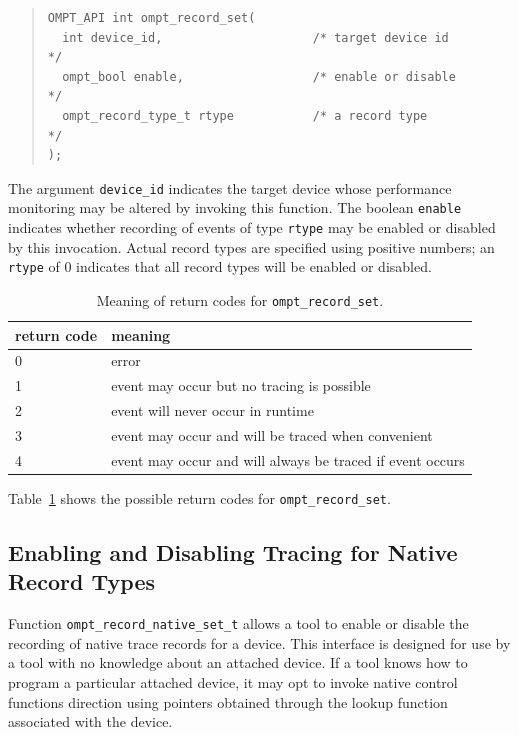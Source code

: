 \documentclass{article}
\begin{document}
\begin{quote}
\begin{verbatim}
OMPT_API int ompt_record_set(
  int device_id,                     /* target device id          */
  ompt_bool enable,                  /* enable or disable         */
  ompt_record_type_t rtype           /* a record type             */
);
\end{verbatim}
\end{quote}
The argument \verb|device_id| indicates the target device whose performance monitoring may be altered by invoking this function. The boolean \verb|enable| indicates whether recording of events of type \verb|rtype| may be enabled or disabled by this invocation.
Actual record types are specified using positive numbers; an \verb|rtype| of  0 indicates that all record types will be enabled or disabled.

\begin{table}
\centering
\begin{tabular}{|l|l|}
\hline
return code & meaning \\\hline
0 & error\\\hline
1 & event may occur but no tracing is possible\\\hline
2 & event will never occur in runtime\\\hline
3 & event may occur and will be traced  when convenient\\\hline
4 & event may occur and will always be traced if event occurs\\\hline
\end{tabular}
\caption{Meaning of return codes for {\tt ompt\_record\_set}.}
\label{table:record_set}
\end{table}

Table~\ref{table:record_set} shows the possible return codes for \verb|ompt_record_set|.


\subsection{Enabling and Disabling Tracing for Native Record Types}
\label{sec:trace-event-native}
Function \verb|ompt_record_native_set_t| allows a tool to enable or disable the recording of native trace records for a device. This interface is designed for use by a tool with no 
knowledge about an attached device. If a tool knows how to program a particular attached device, it may opt to invoke native control functions direction using pointers obtained through the lookup function associated with the device.
\end{document}
